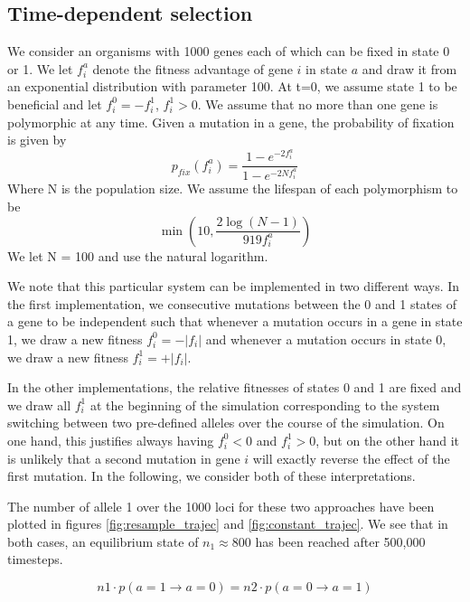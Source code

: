 \documentclass{article}
\begin{document}
\subsection{Time-dependent selection}

We consider an organisms with 1000 genes each of which can be fixed in state 0 or 1. We let $f_i^a$ denote the fitness advantage of gene $i$ in state $a$ and draw it from an exponential distribution with parameter 100.
At t=0, we assume state 1 to be beneficial and let $f_i^0 = -f_i^1$, $f_i^1 > 0$. We assume that no more than one gene is polymorphic at any time. Given a mutation in a gene, the probability of fixation is given by
\begin{equation}\label{eq:pfix}
p_{fix}(f_i^a) = \dfrac{1- e^{-2 f_i^a}}{1- e^{-2 N f_i^a}}
\end{equation}
Where N is the population size. We assume the lifespan of each polymorphism to be
\begin{equation}
\min{(10, \dfrac{2 \log{(N-1)}}{919 f_i^a})}
\end{equation}
We let N = 100 and use the natural logarithm.

We note that this particular system can be implemented in two different ways. In the first implementation, we consecutive mutations between the 0 and 1 states of a gene to be independent such that whenever a mutation occurs in a gene in state 1, we draw a new fitness $f_i^0 = -|f_i|$ and whenever a mutation occurs in state 0, we draw a new fitness $f_i^1 = +|f_i|$.

In the other implementations, the relative fitnesses of states 0 and 1 are fixed and we draw all $f_i^1$ at the beginning of the simulation corresponding to the system switching between two pre-defined alleles over the course of the simulation. On one hand, this justifies always having $f_i^0 < 0$ and $f_i^1 > 0$, but on the other hand it is unlikely that a second mutation in gene $i$ will exactly reverse the effect of the first mutation. In the following, we consider both of these interpretations.

The number of allele 1 over the 1000 loci for these two approaches have been plotted in figures \ref{fig:resample_trajec} and \ref{fig:constant_trajec}. We see that in both cases, an equilibrium state of $n_1 \approx 800$ has been reached after 500,000 timesteps.

\begin{equation}
n1 \cdot p(a=1 \rightarrow a=0) = n2 \cdot  p(a=0 \rightarrow a=1)
\end{equation}
\end{document}

